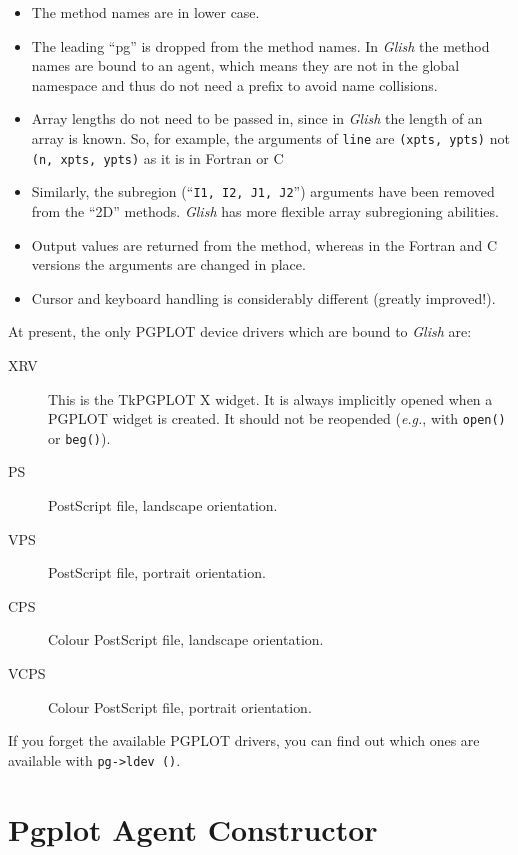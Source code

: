 \begin{itemize}
    \item The method names are in lower case.
    \item The leading ``pg'' is dropped from the method names.  In
          {\em Glish} the method names are bound to an agent, which means
          they are not in the global namespace and thus do not need a
          prefix to avoid name collisions.
    \item Array lengths do not need to be passed in, since in {\em Glish}
          the length of an array is known.  So, for example, the
          arguments of {\tt line} are {\tt (xpts, ypts)} not {\tt (n,
          xpts, ypts)} as it is in {\sc Fortran} or C
    \item Similarly, the subregion (``{\tt I1, I2, J1, J2}'')
          arguments have been removed from the ``2D'' methods.  {\em Glish}
          has more flexible array subregioning abilities.
    \item Output values are returned from the method, whereas in the  {\sc Fortran} and C versions the arguments are changed in place.
    \item Cursor and keyboard handling is considerably different
          (greatly improved!).
\end{itemize}

At present, the only PGPLOT device drivers which are bound to {\em Glish}
are:

\begin{description}
\item[XRV]  This is the TkPGPLOT X widget.  It is always implicitly
            opened when a PGPLOT widget is created.  It should not be
            reopended ({\em e.g.}, with {\tt open()} or {\tt beg()}).
\item[PS]   PostScript file, landscape orientation.
\item[VPS]  PostScript file, portrait orientation.
\item[CPS]  Colour PostScript file, landscape orientation.
\item[VCPS] Colour PostScript file, portrait orientation.
\end{description}

If you forget the available PGPLOT drivers, you can find out which
ones are available with {\tt pg->ldev ()}.

\section{Pgplot Agent Constructor}

